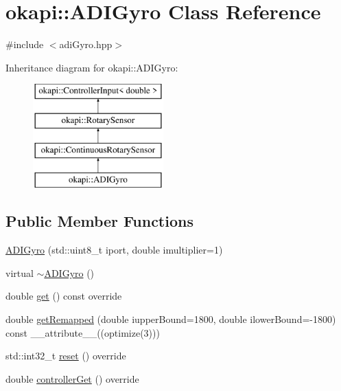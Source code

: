 \hypertarget{classokapi_1_1ADIGyro}{}\section{okapi\+::A\+D\+I\+Gyro Class Reference}
\label{classokapi_1_1ADIGyro}


{\ttfamily \#include $<$adi\+Gyro.\+hpp$>$}

Inheritance diagram for okapi\+::A\+D\+I\+Gyro\+:\begin{figure}[H]
\begin{center}
\leavevmode
\includegraphics[height=4.000000cm]{classokapi_1_1ADIGyro}
\end{center}
\end{figure}
\subsection*{Public Member Functions}
\begin{DoxyCompactItemize}
\item 
\mbox{\hyperlink{classokapi_1_1ADIGyro_a04db661121327089b43d82f9aa21e168}{A\+D\+I\+Gyro}} (std\+::uint8\+\_\+t iport, double imultiplier=1)
\item 
virtual \mbox{\hyperlink{classokapi_1_1ADIGyro_a406cc8ec708c49c507ccab63ffad693c}{$\sim$\+A\+D\+I\+Gyro}} ()
\item 
double \mbox{\hyperlink{classokapi_1_1ADIGyro_a3a4a0a319c723091aad0b2125d701ca4}{get}} () const override
\item 
double \mbox{\hyperlink{classokapi_1_1ADIGyro_a5fa8fa3653e8c2eeff81a56b80e79f7c}{get\+Remapped}} (double iupper\+Bound=1800, double ilower\+Bound=-\/1800) const \+\_\+\+\_\+attribute\+\_\+\+\_\+((optimize(3)))
\item 
std\+::int32\+\_\+t \mbox{\hyperlink{classokapi_1_1ADIGyro_a316eec0bf6008c50fea6d1a621fd2e87}{reset}} () override
\item 
double \mbox{\hyperlink{classokapi_1_1ADIGyro_ad6a8ed104c8383a64c984ceb1147bca4}{controller\+Get}} () override
\end{DoxyCompactItemize}
